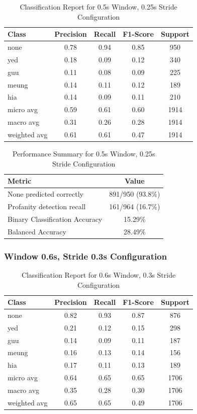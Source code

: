\documentclass[11pt]{article}
\begin{document}
\begin{table}[H]
\centering
\caption{Classification Report for 0.5s Window, 0.25s Stride Configuration}
\begin{tabular}{|l|c|c|c|c|}
\hline
\textbf{Class} & \textbf{Precision} & \textbf{Recall} & \textbf{F1-Score} & \textbf{Support} \\
\hline
none & 0.78 & 0.94 & 0.85 & 950 \\
yed & 0.18 & 0.09 & 0.12 & 340 \\
guu & 0.11 & 0.08 & 0.09 & 225 \\
meung & 0.14 & 0.11 & 0.12 & 189 \\
hia & 0.14 & 0.09 & 0.11 & 210 \\
\hline
micro avg & 0.59 & 0.61 & 0.60 & 1914 \\
macro avg & 0.31 & 0.26 & 0.28 & 1914 \\
weighted avg & 0.61 & 0.61 & 0.47 & 1914 \\
\hline
\end{tabular}
\end{table}

\begin{table}[H]
\centering
\caption{Performance Summary for 0.5s Window, 0.25s Stride Configuration}
\begin{tabular}{lc}
\toprule
\textbf{Metric} & \textbf{Value} \\
\midrule
None predicted correctly & 891/950 (93.8\%) \\
Profanity detection recall & 161/964 (16.7\%) \\
Binary Classification Accuracy & 15.29\% \\
Balanced Accuracy & 28.49\% \\
\bottomrule
\end{tabular}
\end{table}

\subsubsection{Window 0.6s, Stride 0.3s Configuration}

\begin{table}[H]
\centering
\caption{Classification Report for 0.6s Window, 0.3s Stride Configuration}
\begin{tabular}{lcccc}
\toprule
\textbf{Class} & \textbf{Precision} & \textbf{Recall} & \textbf{F1-Score} & \textbf{Support} \\
\midrule
none & 0.82 & 0.93 & 0.87 & 876 \\
yed & 0.21 & 0.12 & 0.15 & 298 \\
guu & 0.14 & 0.09 & 0.11 & 187 \\
meung & 0.16 & 0.13 & 0.14 & 156 \\
hia & 0.17 & 0.11 & 0.13 & 189 \\
\midrule
micro avg & 0.64 & 0.65 & 0.65 & 1706 \\
macro avg & 0.35 & 0.28 & 0.30 & 1706 \\
weighted avg & 0.65 & 0.65 & 0.49 & 1706 \\
\bottomrule
\end{tabular}
\end{table}
\end{document}
